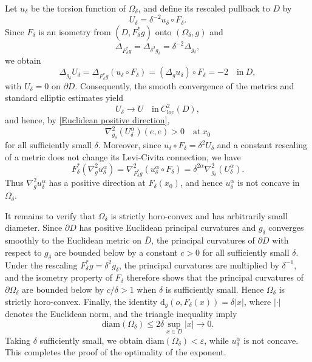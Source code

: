 \documentclass[11pt]{amsart}
\numberwithin{theorem}{section}
\numberwithin{equation}{section}
\begin{document}
Let $u_\delta$ be the torsion function of $\Omega_\delta$, and define its rescaled pullback to $D$ by $$U_\delta=\delta^{-2}u_\delta\circ F_\delta.$$ Since $F_\delta$ is an isometry from $(D,F_\delta^\ast g)$ onto $(\Omega_\delta,g)$ and $$\Delta_{F_\delta^\ast g}=\Delta_{\delta^2g_\delta}=\delta^{-2}\Delta_{g_\delta},$$ we obtain $$\Delta_{g_\delta}U_\delta=\Delta_{F_\delta^\ast g}(u_\delta\circ F_\delta)=(\Delta_g u_\delta)\circ F_\delta=-2\quad\mathrm{in}\ D,$$ with $U_\delta=0$ on $\partial D$. Consequently, the smooth convergence of the metrics and standard elliptic estimates yield $$U_\delta\rightarrow U\quad\mathrm{in}\ C_{\mathrm{loc}}^2(D),$$ and hence, by \eqref{Euclidean positive direction}, $$\nabla^2_{g_\delta}(U_\delta^\alpha)(e,e)>0\quad \mathrm{at}\ x_0$$ for all sufficiently small $\delta$. Moreover, since $u_\delta\circ F_\delta=\delta^2U_\delta$ and a constant rescaling of a metric does not change its Levi-Civita connection, we have $$F_\delta^\ast(\nabla_g^2u_\delta^\alpha)=\nabla_{F_\delta^\ast g}^2(u_\delta^\alpha\circ F_\delta)=\delta^{2\alpha}\nabla_{g_\delta}^2(U_\delta^\alpha).$$ Thus $\nabla_g^2u_\delta^\alpha$ has a positive direction at $F_\delta(x_0)$, and hence $u_\delta^\alpha$ is not concave in $\Omega_\delta$.

It remains to verify that $\Omega_\delta$ is strictly horo-convex and has arbitrarily small diameter. Since $\partial D$ has positive Euclidean principal curvatures and $g_\delta$ converges smoothly to the Euclidean metric on $\overline{D}$, the principal curvatures of $\partial D$ with respect to $g_\delta$ are bounded below by a constant $c>0$ for all sufficiently small $\delta$. Under the rescaling $F_\delta^\ast g=\delta^2g_\delta$, the principal curvatures are multiplied by $\delta^{-1}$, and the isometry property of $F_\delta$ therefore shows that the principal curvatures of $\partial\Omega_\delta$ are bounded below by $c/\delta>1$ when $\delta$ is sufficiently small. Hence $\Omega_\delta$ is strictly horo-convex. Finally, the identity $\mathrm{d}_g(o,F_\delta(x))=\delta|x|$, where $|\cdot|$ denotes the Euclidean norm, and the triangle inequality imply $$\mathrm{diam}(\Omega_\delta)\leq 2\delta\sup_{x\in D}|x|\rightarrow 0.$$ Taking $\delta$ sufficiently small, we obtain $\mathrm{diam}(\Omega_\delta)<\varepsilon$, while $u_\delta^\alpha$ is not concave. This completes the proof of the optimality of the exponent.









\end{document}
